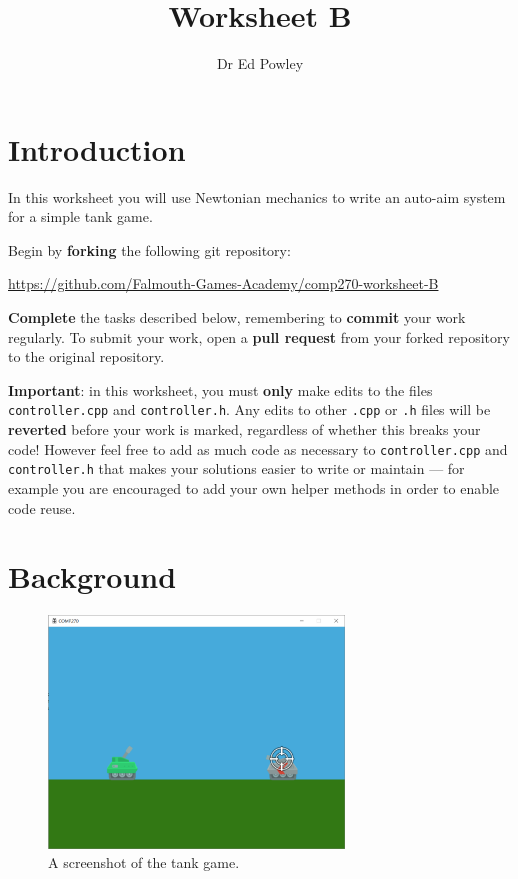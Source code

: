 \documentclass{../../../fal_assignment}
\title{Worksheet B}
\author{Dr Ed Powley}
\begin{document}
\maketitle

\section*{Introduction}

In this worksheet you will use Newtonian mechanics to write an auto-aim system for a simple tank game.

Begin by \textbf{forking} the following git repository:

\begin{center}
	\url{https://github.com/Falmouth-Games-Academy/comp270-worksheet-B}
\end{center}

\textbf{Complete} the tasks described below, remembering to \textbf{commit} your work regularly.
To submit your work, open a \textbf{pull request} from your forked repository to the original repository.

\textbf{Important}: in this worksheet, you must \textbf{only} make edits to the files \texttt{controller.cpp} and \texttt{controller.h}.
Any edits to other \texttt{.cpp} or \texttt{.h} files will be \textbf{reverted} before your work is marked, regardless of whether this breaks your code!
However feel free to add as much code as necessary to \texttt{controller.cpp} and \texttt{controller.h} that makes your solutions easier to write or maintain ---
for example you are encouraged to add your own helper methods in order to enable code reuse.

\section*{Background}

\begin{figure}[ht]
	\begin{center}
		\includegraphics[width=0.7\textwidth]{game}
	\end{center}
	\caption{A screenshot of the tank game.}
	\label{fig:game}
\end{figure}
\end{document}
